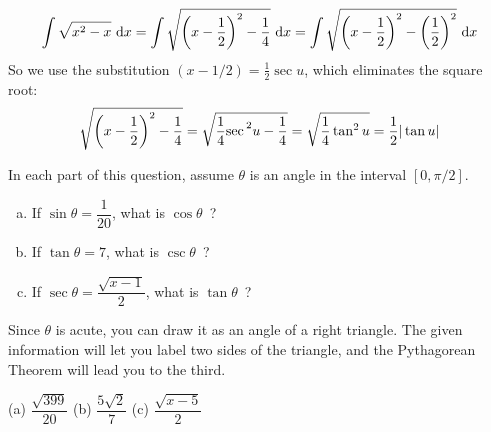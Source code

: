 \begin{solution}
\begin{enumerate}[(a)]
\[\displaystyle\int \sqrt{x^2-x}~\mathrm{d}x=\displaystyle\int \sqrt{\left(x-\frac{1}{2}\right)^2 -\frac{1}{4}}~\mathrm{d}x=\displaystyle\int  \sqrt{\left(x-\frac{1}{2}\right)^2 -\left(\frac{1}{2}\right)^2}~\mathrm{d}x\]
So we use the substitution $(x-1/2) = \frac{1}{2}\sec u$, which eliminates the square root:
\[\sqrt{\left(x-\frac{1}{2}\right)^2-\frac{1}{4}}=\sqrt{\frac{1}{4}{\sec\vphantom{|}}^2 u - \frac{1}{4}} = \sqrt{\frac{1}{4}\tan^2 u} =\frac{1}{2}|\tan u|\]

\end{enumerate}

\end{solution}



\begin{question}\label{prob:s1.9_3}
In each part of this question, assume  $\theta$ is an angle in the interval $\left[ 0,\pi/2\right]$.
\begin{enumerate}[(a)]
\item If $\sin\theta=\dfrac{1}{20}$, what is $\cos\theta$~?
\item If $\tan\theta=7$, what is $\csc\theta$~?
\item If $\sec\theta=\dfrac{\sqrt{x-1}}{2}$, what is $\tan\theta$~?
\end{enumerate}
\end{question}
\begin{hint}
Since $\theta$ is acute, you can draw it as an angle of a right triangle. The given information will let you label two sides of the triangle, and the Pythagorean Theorem will lead you to the third.
\end{hint}
\begin{answer}
(a) $\dfrac{\sqrt{399}}{20}$\qquad
(b) $\dfrac{5\sqrt{2}}{7}$\qquad
(c) $\dfrac{\sqrt{x-5}}{2} $
\end{answer}
